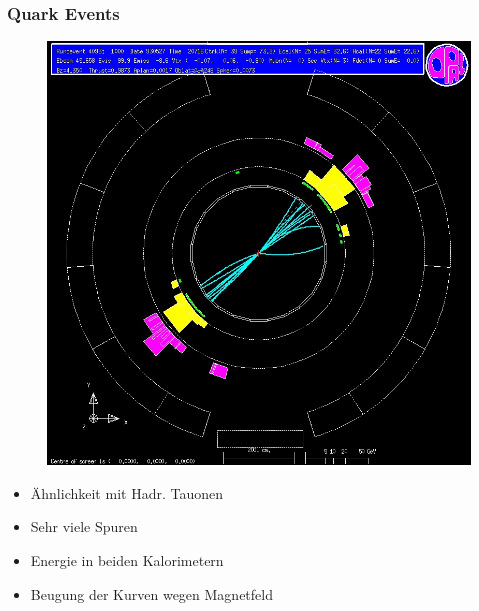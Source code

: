 \begin{frame}
	\frametitle{Quark Events}
		\begin{minipage}{0.54\linewidth}
			\begin{figure}
				\centering
				\includegraphics[width=1.0\linewidth]{graphics/quarkopal}
			\end{figure}
		\end{minipage}
		\begin{minipage}{0.44\linewidth}
			\begin{center}
				\begin{itemize}
					\item Ähnlichkeit mit Hadr. Tauonen\\\hfill
					\item Sehr viele Spuren\\\hfill
					\item Energie in beiden Kalorimetern\\\hfill
					\item Beugung der Kurven wegen Magnetfeld
				\end{itemize}
			\end{center}
		\end{minipage}
\end{frame}



